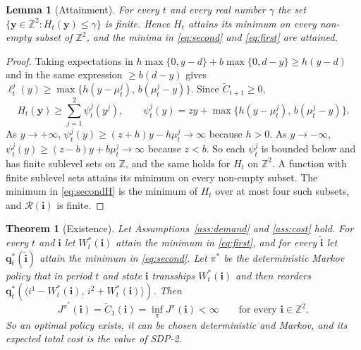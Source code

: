 \documentclass[11pt]{article}
\renewcommand{\vec}[1]{\boldsymbol{#1}}
\newcommand{\Z}{\mathbb{Z}}
\newcommand{\R}{\mathcal{R}}
\newcommand{\Ct}{\widetilde{C}}
\newtheorem{theorem}{Theorem}
\newtheorem{lemma}{Lemma}
\theoremstyle{definition}
\begin{document}
\begin{lemma}[Attainment]\label{lem:coercive}
For every $t$ and every real number $\gamma$ the set $\{\vec{y}\in\Z^2: H_t(\vec{y})\le\gamma\}$ is finite. Hence $H_t$ attains its minimum on every non-empty subset of $\Z^2$, and the minima in \eqref{eq:second} and \eqref{eq:first} are attained.
\end{lemma}

\begin{proof}
Taking expectations in $h\max\{0,y-d\}+b\max\{0,d-y\}\ge h(y-d)$ and in the same expression $\ge b(d-y)$ gives $\ell^j_t(y)\ge\max\{h(y-\mu^j_t),\,b(\mu^j_t-y)\}$. Since $\Ct_{t+1}\ge 0$,
\[
H_t(\vec{y})\ge\sum_{j=1}^2\psi^j_t(y^j),\qquad \psi^j_t(y)=zy+\max\{h(y-\mu^j_t),\,b(\mu^j_t-y)\}.
\]
As $y\to+\infty$, $\psi^j_t(y)\ge(z+h)y-h\mu^j_t\to\infty$ because $h>0$. As $y\to-\infty$, $\psi^j_t(y)\ge(z-b)y+b\mu^j_t\to\infty$ because $z<b$. So each $\psi^j_t$ is bounded below and has finite sublevel sets on $\Z$, and the same holds for $H_t$ on $\Z^2$. A function with finite sublevel sets attains its minimum on every non-empty subset. The minimum in \eqref{eq:secondH} is the minimum of $H_t$ over at most four such subsets, and $\R(\vec{i})$ is finite.
\end{proof}

\begin{theorem}[Existence]\label{thm:existence}
Let Assumptions~\ref{ass:demand} and \ref{ass:cost} hold. For every $t$ and $\vec{i}$ let $W^*_t(\vec{i})$ attain the minimum in \eqref{eq:first}, and for every $\tilde{\vec{i}}$ let $\vec{q}^*_t(\tilde{\vec{i}})$ attain the minimum in \eqref{eq:second}. Let $\pi^*$ be the deterministic Markov policy that in period $t$ and state $\vec{i}$ transships $W^*_t(\vec{i})$ and then reorders $\vec{q}^*_t(\langle i^1-W^*_t(\vec{i}),\,i^2+W^*_t(\vec{i})\rangle)$. Then
\[
J^{\pi^*}(\vec{i})=\Ct_1(\vec{i})=\inf_{\pi}J^{\pi}(\vec{i})<\infty\qquad\text{for every }\vec{i}\in\Z^2 .
\]
So an optimal policy exists, it can be chosen deterministic and Markov, and its expected total cost is the value of SDP-2.
\end{theorem}
\end{document}

